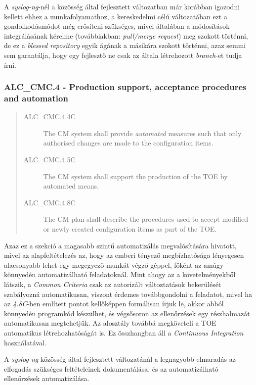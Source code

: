 A \emph{syslog-ng}-nél a közösség által fejlesztett változatban már korábban igazodni kellett ehhez
a munkafolyamathoz, a kereskedelmi célú változatában ezt a gondolkodásmódot még erősíteni szükséges,
mivel általában a módosítások integrálásának kérelme (továbbiakban: \emph{pull/merge request}) meg
szokott történni, de ez a \emph{blessed repository} egyik ágának a másikára szokott történni, azaz
semmi sem garantálja, hogy egy fejlesztő ne csak az általa létrehozott \emph{branch}-et tudja írni.

\pagebreak[1]
\subsubsection{ALC\_CMC.4 - Production support, acceptance procedures and automation }
\begin{quote}
    \begin{description}
        \item[ALC\_CMC.4.4C]{The CM system shall provide \emph{automated} measures such that only
            authorised changes are made to the configuration items.}
        \item[ALC\_CMC.4.5C]{The CM system shall support the production of the TOE by automated
            means.}
        \item[ALC\_CMC.4.8C]{The CM plan shall describe the procedures used to accept modified or
            newly created configuration items as part of the TOE.}
    \end{description}
\end{quote}

Azaz ez a szekció a magasabb szintű automatizálás megvalósítására hivatott, mivel az
alapfeltételezés az, hogy az emberi tényező megbízhatósága lényegesen alacsonyabb lehet egy
megegyező munkát végző géppel, főként az amúgy könnyedén automatizálható feladatoknál.  Mint ahogy
az a követelményekből látszik, a \emph{Common Criteria} csak az autorizált változtatások bekerülését
szabályozná automatikusan, viszont érdemes továbbgondolni a feladatot, mivel ha az \emph{4.8C}-ben
említett pontot kellőképpen formálisan írjuk le, akkor abból könnyedén programkód készülhet, és
végsősoron az ellenőrzések egy részhalmazát automatikusan megtehetjük.  Az alosztály továbbá
megköveteli a TOE automatikus létrehozhatóságát is. Ez összhangban áll a \emph{Continuous
Integration} használatával.

A \emph{syslog-ng} közösség által fejlesztett változatánál a legnagyobb elmaradás az elfogadás
szükséges feltételeinek dokumentálása, és az automatizálható ellenőrzések automatizálása.


